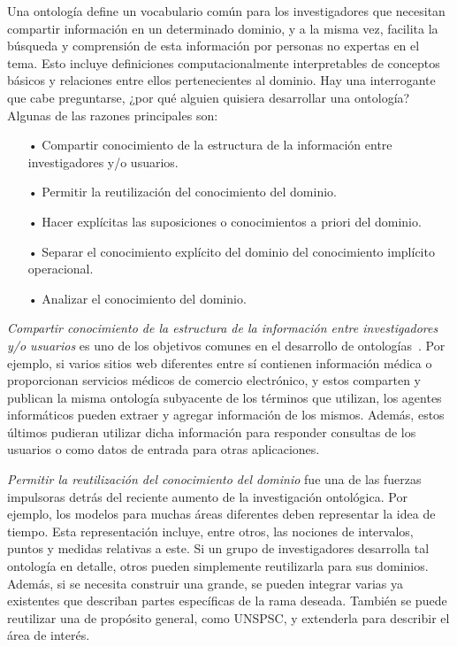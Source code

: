 Una ontología define un vocabulario común para los investigadores que necesitan compartir información en un determinado dominio, y a la misma vez, facilita la búsqueda y comprensión de esta información por personas no expertas en el tema. Esto incluye definiciones computacionalmente interpretables de conceptos básicos y relaciones entre ellos pertenecientes al dominio. Hay una interrogante que cabe preguntarse, ¿por qué alguien quisiera desarrollar una ontología? Algunas de las razones principales son:

\begin{itemize}
	\item[•] Compartir conocimiento de la estructura de la información entre investigadores y/o usuarios.
	\item[•] Permitir la reutilización del conocimiento del dominio.
	\item[•] Hacer explícitas las suposiciones o conocimientos a priori del dominio.
	\item[•] Separar el conocimiento explícito del dominio del conocimiento implícito operacional.
	\item[•] Analizar el conocimiento del dominio.
\end{itemize}

\textit{Compartir conocimiento de la estructura de la información entre investigadores y/o usuarios} es uno de los objetivos comunes en el desarrollo de ontologías~\cite{ref:10,ref:4}. Por ejemplo, si varios sitios web diferentes entre sí contienen información médica o proporcionan servicios médicos de comercio electrónico, y estos comparten y publican la misma ontología subyacente de los términos que utilizan, los agentes informáticos pueden extraer y agregar información de los mismos. Además, estos últimos pudieran utilizar dicha información para responder consultas de los usuarios o como datos de entrada para otras aplicaciones.

\textit{Permitir la reutilización del conocimiento del dominio} fue una de las fuerzas impulsoras detrás del reciente aumento de la investigación ontológica. Por ejemplo, los modelos para muchas áreas diferentes deben representar la idea de tiempo. Esta representación incluye, entre otros, las nociones de intervalos, puntos y medidas relativas a este. Si un grupo de investigadores desarrolla tal ontología en detalle, otros pueden simplemente reutilizarla para sus dominios. Además, si se necesita construir una grande, se pueden integrar varias ya existentes que describan partes específicas de la rama deseada. También se puede reutilizar una de propósito general, como UNSPSC, y extenderla para describir el área de interés.

